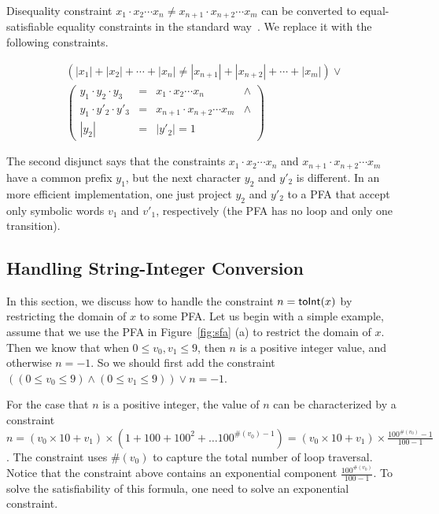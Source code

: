 \documentclass[sigplan,review,anonymous]{acmart}\settopmatter{printfolios=true,printccs=false,printacmref=false}
\begin{document}
Disequality constraint $x_1\cdot x_2 \cdots x_n \neq x_{n+1}\cdot x_{n+2} \cdots x_m$ can be converted to equal-satisfiable equality constraints in the standard way~\cite{abdulla2015norn}. We replace it with the following constraints.

$$
\begin{array}{c}
(|x_1|+ |x_2|+ \cdots +|x_n| \neq |x_{n+1}| + |x_{n+2}|+ \cdots +|x_m|)\vee \\
\left(
	\begin{array}{cccc}
	
	 y_1\cdot y_2\cdot y_3 &=& x_1\cdot x_2 \cdots x_n &\wedge\\
	 y_1 \cdot y'_2 \cdot y'_3 &=& x_{n+1}\cdot x_{n+2} \cdots x_m &\wedge\\
	|y_2|&=&|y'_2|=1
	\end{array}

\right)
\end{array}
$$

The second disjunct says that the constraints $x_1\cdot x_2 \cdots x_n$ and $x_{n+1}\cdot x_{n+2} \cdots x_m$ have a common prefix $y_1$, but the next character $y_2$ and $y'_2$ is different. In an more efficient implementation, one just project $y_2$ and $y'_2$ to a PFA that accept only symbolic words $v_1$ and $v'_1$, respectively (the PFA has no loop and only one transition). 








\subsection{Handling String-Integer Conversion} \label{section:s2i}

In this section, we discuss how to handle the constraint $n=\mbox{\textsf{toInt}($x$)}$ by restricting the domain of $x$ to some PFA. Let us begin with a simple example, assume that we use the PFA in Figure~\ref{fig:sfa} (a) to restrict the domain of $x$. Then we know that when $0\leq v_0,v_1 \leq 9$, then $n$ is a positive integer value, and otherwise $n =-1$. So we should first add the constraint $ ((0\leq v_0\leq 9) \wedge (0\leq v_1\leq 9)) \vee n=-1 $.

For the case that $n$ is a positive integer, the value of $n$ can be characterized by a constraint $n= (v_0\times 10+ v_1) \times (1+100 +100^2 + \ldots 100 ^{\#(v_0)-1})=  (v_0\times 10+ v_1) \times \frac{100^{\#(v_0)}-1}{100-1}$. 
The constraint uses $\#(v_0)$ to capture the total number of loop traversal.
Notice that the constraint above contains an exponential component $\frac{100^{\#(v_0)}}{100-1}$. To solve the satisfiability of this formula, one need to solve an exponential constraint. 
\end{document}
